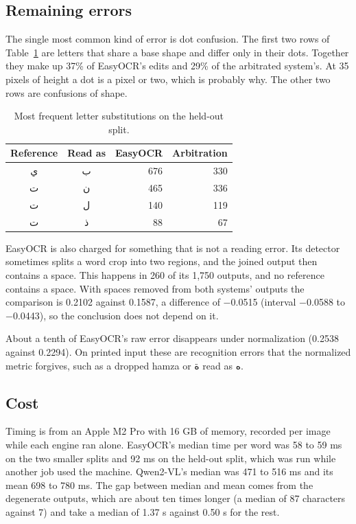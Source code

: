 \documentclass[11pt,a4paper]{article}
\newcommand{\ar}[1]{{\beginR\arabicfont #1\endR}}
\begin{document}
\subsection{Remaining errors}

The single most common kind of error is dot confusion. The first two rows of
Table~\ref{tab:conf} are letters that share a base shape and differ only in
their dots. Together they make up 37\% of EasyOCR's edits and 29\% of the
arbitrated system's. At 35 pixels of height a dot is a pixel or two, which is
probably why. The other two rows are confusions of shape.

\begin{table}[H]
\centering
\small
\begin{tabular}{ccrr}
\toprule
Reference & Read as & EasyOCR & Arbitration \\
\midrule
\ar{ي} & \ar{ب} & 676 & 330 \\
\ar{ت} & \ar{ن} & 465 & 336 \\
\ar{ت} & \ar{ل} & 140 & 119 \\
\ar{ت} & \ar{ذ} & 88 & 67 \\
\bottomrule
\end{tabular}
\caption{Most frequent letter substitutions on the held-out split.}
\label{tab:conf}
\end{table}

EasyOCR is also charged for something that is not a reading error. Its
detector sometimes splits a word crop into two regions, and the joined output
then contains a space. This happens in 260 of its 1,750 outputs, and no
reference contains a space. With spaces removed from both systems' outputs
the comparison is 0.2102 against 0.1587, a difference of −0.0515 (interval
−0.0588 to −0.0443), so the conclusion does not depend on it.

About a tenth of EasyOCR's raw error disappears under normalization (0.2538
against 0.2294). On printed input these are recognition errors that the
normalized metric forgives, such as a dropped hamza or \ar{ة} read as \ar{ه}.

\subsection{Cost}

Timing is from an Apple M2 Pro with 16 GB of memory, recorded per image while
each engine ran alone. EasyOCR's median time per word was 58 to 59 ms on the
two smaller splits and 92 ms on the held-out split, which was run while
another job used the machine. Qwen2-VL's median was 471 to 516 ms and its
mean 698 to 780 ms. The gap between median and mean comes from the
degenerate outputs, which are about ten times longer (a median of 87
characters against 7) and take a median of 1.37 s against 0.50 s for the
rest.
\end{document}
